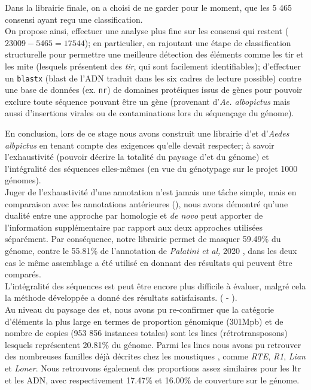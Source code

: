 \documentclass[10pt]{article}
\begin{document}
Dans la librairie finale, on a choisi de ne garder pour le moment, que les 5 465 consensi ayant reçu une classification. \\
On propose ainsi, effectuer une analyse plus fine sur les consensi qui restent ($23 009 - 5 465 = 17 544$); en particulier, en rajoutant une étape de classification structurelle pour permettre une meilleure détection des éléments comme les \acrshort{tir} et les \acrshort{mite} (lesquels présentent des \textit{\acrlong{tir}}, qui sont facilement identifiables); d'effectuer un \texttt{blastx} (blast de l'ADN traduit dans les six cadres de lecture possible) contre une base de données (ex. \texttt{nr}) de domaines protéiques issus de gènes pour pouvoir exclure toute séquence pouvant être un gène (provenant d'\textit{Ae. albopictus} mais aussi d'insertions virales ou de contaminations lors du séquençage du génome). \\

\bigskip

En conclusion, lors de ce stage nous avons construit une librairie d'\acrlong{et} d'\textit{Aedes albpictus} en tenant compte des exigences qu'elle devait respecter; à savoir l'exhaustivité (pouvoir décrire la totalité du paysage d'\acrshort{et} du génome) et l'intégralité des séquences elles-mêmes (en vue du génotypage sur le projet 1000 génomes). \\
Juger de l'exhaustivité d'une annotation n'est jamais une tâche simple, mais en comparaison avec les annotations antérieures (\tableautorefname{ \ref{tab:annot_state_of_art}}), nous avons démontré qu'une dualité entre une approche par homologie et \textit{de novo} peut apporter de l'information supplémentaire par rapport aux deux approches utilisées séparément. Par conséquence, notre librairie permet de masquer 59.49\% du génome, contre le 55.81\% de l'annotation de \textit{Palatini et al,} 2020 , dans les deux cas le même assemblage a été utilisé en donnant des résultats qui peuvent être comparés. \\
L'intégralité des séquences est peut être encore plus difficile à évaluer, malgré cela la méthode développée a donné des résultats satisfaisants. (\sectionautorefname{ \ref{sec:polish}} - \textsc{}). \\
Au niveau du paysage des \acrshort{et}, nous avons pu re-confirmer que la catégorie d'éléments la plus large en termes de proportion génomique (301Mpb) et de nombre de copies (953 856 instances totales) sont les \acrshort{line}s (rétrotransposons)  lesquels représentent 20.81\% du génome. Parmi les \acrshort{line}s nous avons pu retrouver des nombreuses familles déjà décrites chez les moustiques \cite{tu_structural_1998, biedler_non-ltr_2003, boulesteix_transposable_2005}, comme \textit{RTE}, \textit{R1}, \textit{Lian} et \textit{Loner}. Nous retrouvons également des proportions assez similaires pour les \acrshort{ltr} et les ADN, avec respectivement 17.47\% et 16.00\% de couverture sur le génome.
\end{document}
